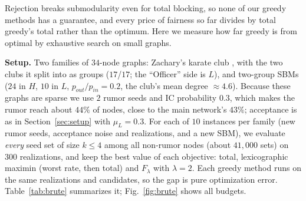 
Rejection breaks submodularity even for total blocking, so none of our greedy methods has a guarantee, and every price of fairness so far divides by total greedy's total rather than the optimum. Here we measure how far greedy is from optimal by exhaustive search on small graphs.

\textbf{Setup.} Two families of $34$-node graphs: Zachary's karate club \cite{zachary}, with the two clubs it split into as groups ($17$/$17$; the ``Officer'' side is $L$), and two-group SBMs ($24$ in $H$, $10$ in $L$, $p_{out}/p_{in}=0.2$, the club's mean degree $\approx4.6$). Because these graphs are sparse we use $2$ rumor seeds and IC probability $0.3$, which makes the rumor reach about $44\%$ of nodes, close to the main network's $43\%$; acceptance is as in Section~\ref{sec:setup} with $\mu_L=0.3$. For each of $10$ instances per family (new rumor seeds, acceptance noise and realizations, and a new SBM), we evaluate \emph{every} seed set of size $k\le4$ among all non-rumor nodes (about $41{,}000$ sets) on $300$ realizations, and keep the best value of each objective: total, lexicographic maximin (worst rate, then total) and $F_\lambda$ with $\lambda=2$. Each greedy method runs on the same realizations and candidates, so the gap is pure optimization error. Table~\ref{tab:brute} summarizes it; Fig.~\ref{fig:brute} shows all budgets.

